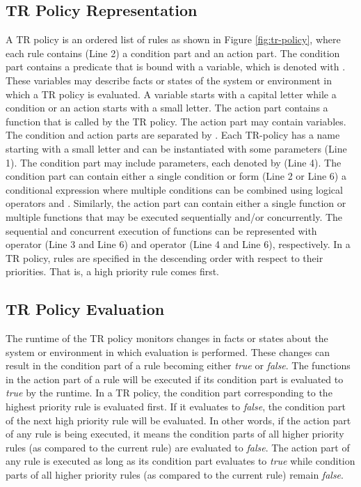 \documentclass[10pt, conference, compsocconf]{IEEEtran}
\begin{document}
\subsection{TR Policy Representation}
A TR policy is an ordered list of rules as shown in Figure \ref{fig:tr-policy}, where each rule contains (Line 2) a condition part and an action part. The condition part contains a predicate that is bound with a variable, which is denoted with . These variables may describe facts or states of the system or environment in which a TR policy is evaluated. A variable starts with a capital letter while a condition or an action starts with a small letter. The action part contains a function that is called by the TR policy. The action part may contain variables. The condition and action parts are separated by . Each TR-policy has a name starting with a small letter and can be instantiated with some parameters (Line 1). The condition part may include parameters, each denoted by  (Line 4). The condition part can contain either a single condition or form (Line 2 or Line 6) a conditional expression where multiple conditions can be combined using logical operators  and . Similarly, the action part can contain either a single function or multiple functions that may be executed sequentially and/or concurrently. The sequential and concurrent execution of functions can be represented with  operator (Line 3 and Line 6) and  operator (Line 4 and Line 6), respectively. In a TR policy, rules are specified in the descending order with respect to their priorities. That is, a high priority rule comes first.

\subsection{TR Policy Evaluation}
The runtime of the TR policy monitors changes in facts or states about the system or environment in which evaluation is performed. These changes can result in the condition part of a rule becoming either \emph{true} or \emph{false}. The functions in the action part of a rule will be executed if its condition part is evaluated to \emph{true} by the runtime. In a TR policy, the condition part corresponding to the highest priority rule is evaluated first. If it evaluates to \emph{false}, the condition part of the next high priority rule will be evaluated. In other words, if the action part of any rule is being executed, it means the condition parts of all higher priority rules (as compared to the current rule) are evaluated to \emph{false}. The action part of any rule is executed as long as its condition part evaluates to \emph{true} while condition parts of all higher priority rules (as compared to the current rule) remain \emph{false}.
\end{document}
